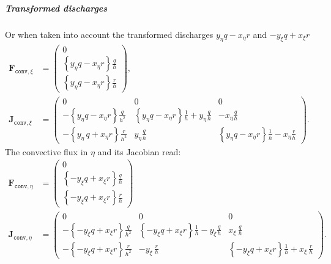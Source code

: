 {{\subparagraph*{Transformed discharges}
Or when taken into account the transformed discharges $y_\eta q - x_\eta r$ and $-y_\xi q + x_\xi r$
%
\begin{align}
    \mathbf{F}_{\texttt{conv},\xi}&=
    \begin{pmatrix}
        0\\
        \left\{ y_{\eta} q- x_{\eta} r\right\} \frac{q}{h}\\
        \left\{ y_{\eta}q - x_{\eta} r \right\} \frac{r}{h}
    \end{pmatrix},
    \\
    \mathbf{J}_{\texttt{conv},\xi}&=
    \begin{pmatrix}
        0 & 0 & 0
        \\
        -\left\{y_{\eta}q - x_{\eta} r \right\}\frac{q}{h^2}
        & \left\{y_{\eta}q - x_{\eta} r \right\}\frac{1}{h} + y_{\eta}\frac{q}{h}
        & - x_{\eta} \frac{q}{h}
        \\
        -\left\{ y_{\eta}\, q + x_{\eta}r\right\} \frac{r}{h^2}
        & y_{\eta} \frac{q}{h}
        & \left\{ y_{\eta}q - x_{\eta} r  \right\}\frac{1}{h} - x_{\eta} \frac{r}{h}
    \end{pmatrix}.
\end{align}
%
The convective flux in $\eta$ and its Jacobian read:
%
\begin{align}
    \mathbf{F}_{\texttt{conv},\eta}&=
    \begin{pmatrix}
        0\\
        \left\{-y_{\xi}q + x_{\xi} r \right\} \frac{q}{h}\\
        \left\{-y_{\xi}q + x_{\xi} r \right\} \frac{r}{h}
    \end{pmatrix}
    \\
    \mathbf{J}_{\texttt{conv},\eta}&=
    \begin{pmatrix}
        0 & 0 & 0\\
        -\left\{ -y_{\xi} q + x_\xi r\right\} \frac{q}{h^2}
        &\left\{-y_{\xi}q + x_{\xi}r\right\} \frac{1}{h} - y_\xi \frac{q}{h}
        &  x_{\xi}\, \frac{q}{h}\\
        -\left\{ -y_{\xi} q + x_{\xi} r \right\} \frac{r}{h^2}
        & -y_{\xi}\, \frac{r}{h}
        & \left\{ -y_{\xi} q  + x_{\xi} r \right\} \frac{1}{h}  + x_{\xi}\, \frac{r}{h}
    \end{pmatrix}.
\end{align}

}}
